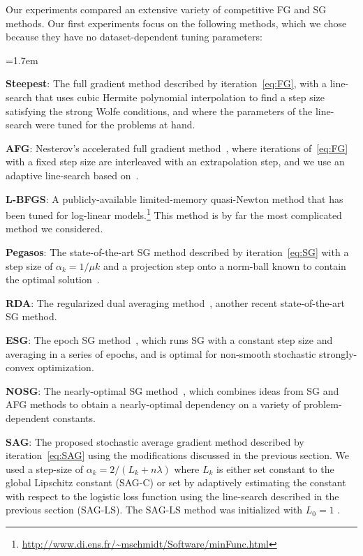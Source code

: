 \documentclass{article}
\newcommand{\note}[1]{{\textbf{\color{red}#1}}}
\begin{document}
 Our experiments compared an extensive variety of competitive FG and SG methods.  Our first experiments focus on the following methods, which
 we chose because they have no dataset-dependent tuning parameters:
\begin{list}{}{\leftmargin=1.7em}
   \addtolength{\itemsep}{-.215\baselineskip}
\item[--]\textbf{Steepest}: The full gradient method described by
iteration~\eqref{eq:FG}, with a line-search that uses 
cubic Hermite polynomial interpolation to find a step size satisfying
the strong Wolfe conditions, and where the parameters of the line-search
were tuned for the problems at hand.
\item [--]\textbf{AFG}: Nesterov's accelerated full gradient method~\cite{nesterov1983method}, where iterations of~\eqref{eq:FG} with a fixed step size are interleaved with an extrapolation step, and we use an adaptive line-search based on~\cite{liu2009large}.
\item[--] \textbf{L-BFGS}: A publicly-available limited-memory quasi-Newton method that has been tuned for log-linear models.\footnote{\small \url{http://www.di.ens.fr/~mschmidt/Software/minFunc.html}}  This method is by far the most complicated method we considered.
\item[--] \textbf{Pegasos}: The state-of-the-art SG method described by
iteration~\eqref{eq:SG} with a step size of $\alpha_k = 1/\mu k$ and a projection step onto a norm-ball known to contain the optimal solution~\cite{shalev2007pegasos}.
\item [--]\textbf{RDA}: The regularized dual averaging method~\cite{xiao2010dual}, another recent state-of-the-art SG method.
\item [--]\textbf{ESG}: The epoch SG method~\cite{hazan2010beyond}, which runs SG with a constant step size and averaging in a series of epochs, and is optimal for non-smooth stochastic strongly-convex optimization.
\item [--]\textbf{NOSG}: The nearly-optimal SG method~\cite{ghadimi2010optimal}, which combines ideas from SG and AFG methods to obtain a nearly-optimal dependency on a variety of problem-dependent constants.
\item[--] \textbf{SAG}: The proposed stochastic average gradient method
described by iteration~\eqref{eq:SAG} using the modifications discussed in the previous section.  We used a step-size of $\alpha_k = 2/(L_k + n\lambda)$ where $L_k$ is either set constant to the global Lipschitz constant (SAG-C) or set by adaptively estimating the constant with respect to the logistic loss function using the line-search described in the previous section (SAG-LS). The SAG-LS method was initialized with $L_0=1$ .
\end{list}
\end{document}
